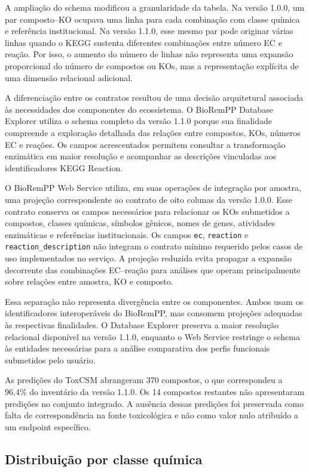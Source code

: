 A ampliação do schema modificou a granularidade da tabela. Na versão 1.0.0, um
par composto--KO ocupava uma linha para cada combinação com classe química e
referência institucional. Na versão 1.1.0, esse mesmo par pode originar várias
linhas quando o KEGG sustenta diferentes combinações entre número EC e reação.
Por isso, o aumento do número de linhas não representa uma expansão
proporcional do número de compostos ou KOs, mas a representação explícita de
uma dimensão relacional adicional.

A diferenciação entre os contratos resultou de uma decisão arquitetural
associada às necessidades dos componentes do ecossistema. O BioRemPP Database
Explorer utiliza o schema completo da versão 1.1.0 porque sua finalidade
compreende a exploração detalhada das relações entre compostos, KOs, números
EC e reações. Os campos acrescentados permitem consultar a transformação
enzimática em maior resolução e acompanhar as descrições vinculadas aos
identificadores KEGG Reaction.

O BioRemPP Web Service utiliza, em suas operações de integração por amostra,
uma projeção correspondente ao contrato de oito colunas da versão 1.0.0. Esse
contrato conserva os campos necessários para relacionar os KOs submetidos a
compostos, classes químicas, símbolos gênicos, nomes de genes, atividades
enzimáticas e referências institucionais. Os campos \texttt{ec},
\texttt{reaction} e \texttt{reaction\_description} não integram o contrato
mínimo requerido pelos casos de uso implementados no serviço. A projeção
reduzida evita propagar a expansão decorrente das combinações EC--reação para
análises que operam principalmente sobre relações entre amostra, KO e
composto.

Essa separação não representa divergência entre os componentes. Ambos usam os
identificadores interoperáveis do BioRemPP, mas consomem projeções adequadas às
respectivas finalidades. O Database Explorer preserva a maior resolução
relacional disponível na versão 1.1.0, enquanto o Web Service restringe o
schema às entidades necessárias para a análise comparativa dos perfis
funcionais submetidos pelo usuário.

As predições do ToxCSM abrangeram 370 compostos, o que correspondeu a
96,4\% do inventário da versão 1.1.0. Os 14 compostos restantes não
apresentaram predições no conjunto integrado. A ausência dessas predições foi
preservada como falta de correspondência na fonte toxicológica e não como valor
nulo atribuído a um endpoint específico.

\subsection{Distribuição por classe química}

